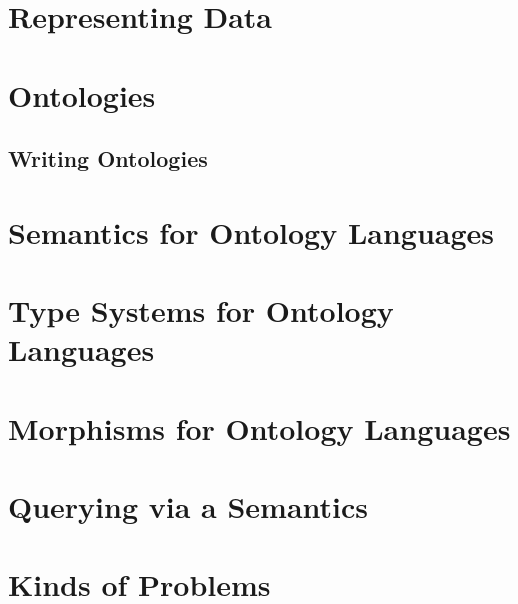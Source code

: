\documentclass{book}
\begin{document}
\chapter{Representing Data}\label{sec:wuv:codecs}
  

\chapter{Ontologies}
 
 \section{Writing Ontologies}\label{sec:onto:write}
   

\chapter{Semantics for Ontology Languages}\label{sec:bolsem}
 

\chapter{Type Systems for Ontology Languages}\label{sec:onto:type}
   

\chapter{Morphisms for Ontology Languages}\label{sec:onto:morph}
   

\chapter{Querying via a Semantics}\label{sec:bolquery}
 

\chapter{Kinds of Problems}\label{sec:bolquery}


%
%
%
%
%
%
%



\end{document}

